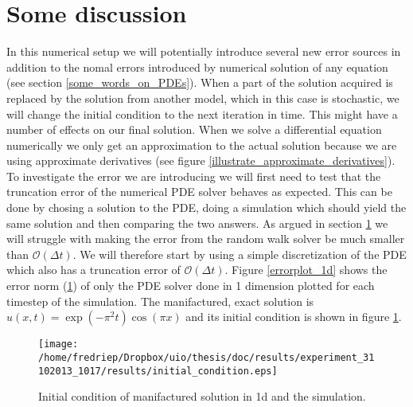 \section{Some discussion}
In this numerical setup we will potentially introduce several new error sources in addition to the nomal errors introduced by numerical solution of any equation (see section \ref{some_words_on_PDEs}). 
When a part of the solution acquired is replaced by the solution from another model, which in this case is stochastic, we will change the initial condition to the next iteration in time. 
This might have a number of effects on our final solution. 
When we solve a differential equation numerically we only get an approximation to the actual solution because we are using approximate derivatives (see figure \ref{illustrate_approximate_derivatives}). 
To investigate the error we are introducing we will first need to test that the truncation error of the numerical PDE solver behaves as expected. 
This can be done by chosing a solution to the PDE, doing a simulation which should yield the same solution and then comparing the two answers. 
As argued in section \ref{} we will struggle with making the error from the random walk solver be much smaller than $\mathcal{O}(\Delta t)$. 
We will therefore start by using a simple discretization of the PDE which also has a truncation error of $\mathcal{O}(\Delta t)$. 
Figure \ref{errorplot_1d} shows the error norm (\ref{}) of only the PDE solver done in 1 dimension plotted for each timestep of the simulation. 
The manifactured, exact solution is $u(x,t) = \exp\left(-\pi^2t\right)\cos(\pi x)$ and its initial condition is shown in figure \ref{}.

\begin{figure}[H]
 \centering
 \texttt{[image: /home/fredriep/Dropbox/uio/thesis/doc/results/experiment\_31102013\_1017/results/initial\_condition.eps]}
 \caption[Initial condition in 1d]{Initial condition of manifactured solution in 1d and the simulation.}
 \label{initial_condition_1d}
\end{figure}


